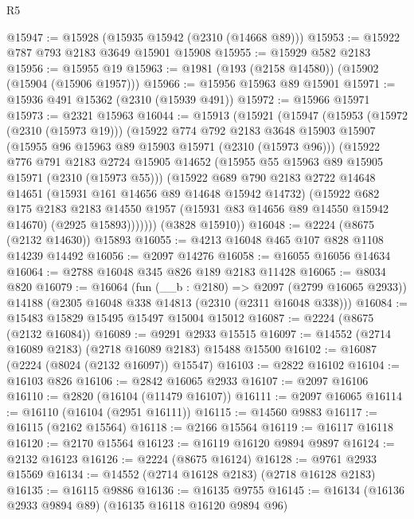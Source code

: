 \begin{lexlean}{R5}
\begin{coremodule}
@15947 := @15928 (@15935 @15942 (@2310 (@14668 @89)))
@15953 := @15922 @787 @793 @2183 @3649 @15901 @15908
@15955 := @15929 @582 @2183
@15956 := @15955 @19
@15963 := @1981 (@193 (@2158 @14580)) (@15902 (@15904 (@15906 @1957)))
@15966 := @15956 @15963 @89 @15901
@15971 := @15936 @491 @15362 (@2310 (@15939 @491))
@15972 := @15966 @15971
@15973 := @2321 @15963
@16044 := @15913
    (@15921
      (@15947
        (@15953
          (@15972 (@2310 (@15973 @19)))
          (@15922
            @774
            @792
            @2183
            @3648
            @15903
            @15907
            (@15955 @96 @15963 @89 @15903 @15971 (@2310 (@15973 @96)))
            (@15922
              @776
              @791
              @2183
              @2724
              @15905
              @14652
              (@15955 @55 @15963 @89 @15905 @15971 (@2310 (@15973 @55)))
              (@15922
                @689
                @790
                @2183
                @2722
                @14648
                @14651
                (@15931 @161 @14656 @89 @14648 @15942 @14732)
                (@15922
                  @682
                  @175
                  @2183
                  @2183
                  @14550
                  @1957
                  (@15931 @83 @14656 @89 @14550 @15942 @14670)
                  (@2925 @15893)))))))
      (@3828 @15910))
@16048 := @2224 (@8675 (@2132 @14630)) @15893
@16055 := @4213 @16048 @465 @107 @828 @1108 @14239 @14492
@16056 := @2097 @14276
@16058 := @16055 @16056 @14634
@16064 := @2788 @16048 @345 @826 @189 @2183 @11428
@16065 := @8034 @820
@16079 := @16064
    (fun (__b : @2180) => @2097 (@2799 @16065 @2933))
    @14188
    (@2305 @16048 @338 @14813 (@2310 (@2311 @16048 @338)))
@16084 := @15483 @15829 @15495 @15497 @15004 @15012
@16087 := @2224 (@8675 (@2132 @16084))
@16089 := @9291 @2933 @15515
@16097 := @14552 (@2714 @16089 @2183) (@2718 @16089 @2183) @15488 @15500
@16102 := @16087 (@2224 (@8024 (@2132 @16097)) @15547)
@16103 := @2822 @16102
@16104 := @16103 @826
@16106 := @2842 @16065 @2933
@16107 := @2097 @16106
@16110 := @2820 (@16104 (@11479 @16107))
@16111 := @2097 @16065
@16114 := @16110 (@16104 (@2951 @16111))
@16115 := @14560 @9883
@16117 := @16115 (@2162 @15564)
@16118 := @2166 @15564
@16119 := @16117 @16118
@16120 := @2170 @15564
@16123 := @16119 @16120 @9894 @9897
@16124 := @2132 @16123
@16126 := @2224 (@8675 @16124)
@16128 := @9761 @2933 @15569
@16134 := @14552 (@2714 @16128 @2183) (@2718 @16128 @2183)
@16135 := @16115 @9886
@16136 := @16135 @9755
@16145 := @16134 (@16136 @2933 @9894 @89) (@16135 @16118 @16120 @9894 @96)

\end{coremodule}
\end{lexlean}
